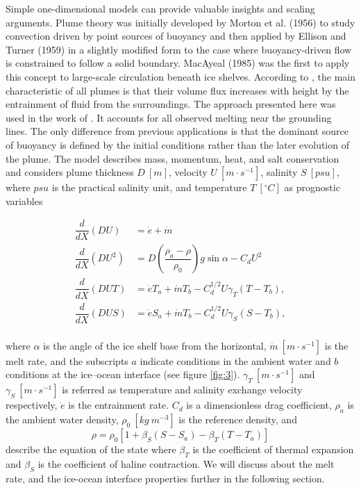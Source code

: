 \documentclass[11pt,a4paper]{article}
\begin{document}
	Simple one-dimensional models can provide valuable insights and scaling arguments. Plume theory was initially developed by Morton et al. (1956) to study convection driven by point sources of buoyancy and then applied by Ellison and Turner (1959) in a slightly modified form to the case where buoyancy-driven flow is constrained to follow a solid boundary. MacAyeal (1985) was the first to apply this concept to large-scale circulation beneath ice shelves. According to \cite{jenkins2011convection}, the main characteristic of all plumes is that their volume flux increases with height by the entrainment of fluid from the surroundings. The approach presented here was used in the work of \citep{jenkins2011convection}. It accounts for all observed melting near the grounding lines. The only difference from previous applications is that the dominant source of buoyancy is defined by the initial conditions rather than the later evolution of the plume. The model describes mass, momentum, heat, and salt conservation and considers plume thickness $D\ [m]$, velocity $U\ [m\cdot s^{-1}]$, salinity $S\ [psu]$, where $psu$ is the practical salinity unit, and temperature $T\ [^{\circ} C]$ as prognostic variables
	
	\begin{align*}
	    \dfrac{d}{dX}(DU)& = \dot{e} + \dot{m}\\
	    \dfrac{d}{dX}(DU^2)& = D\left(\dfrac{\rho_a-\rho}{\rho_0}\right)g\sin\alpha - C_dU^2\\
	    \dfrac{d}{dX}(DUT)& = \dot{e}T_a + \dot{m}T_b - C_d^{1/2}U\gamma_T(T-T_b),\\
	    \dfrac{d}{dX}(DUS)& = \dot{e}S_a + \dot{m}T_b - C_d^{1/2}U\gamma_S(S-T_b),\\
	\end{align*}
	
	\noindent where $\alpha$ is the angle of the ice shelf base from the horizontal, $\dot{m}\ [m\cdot s^{-1}]$ is the melt rate, and the subscripts $a$ indicate conditions in the ambient water and $b$ conditions at the ice–ocean interface (see figure \ref{fig:3}). $\gamma_T\ [m\cdot s^{-1}]$ and $\gamma_S\ [m\cdot s^{-1}]$ is referred as temperature and salinity exchange velocity respectively, $\dot{e}$ is the entrainment rate. $C_d$ is a dimensionless drag coefficient, $\rho_a$ is the ambient water density, $\rho_0\ [kg\ m^{-3}]$ is the reference density, and 
	$$\rho = \rho_0\left[1+\beta_S(S-S_a)-\beta_T(T-T_a)\right]$$ describe the equation of the state where $\beta_T$ is the coefficient of thermal expansion and $\beta_S$ is the coefficient of haline contraction. We will discuss about the melt rate, and the ice-ocean interface properties further in the following section.
	
\end{document}
